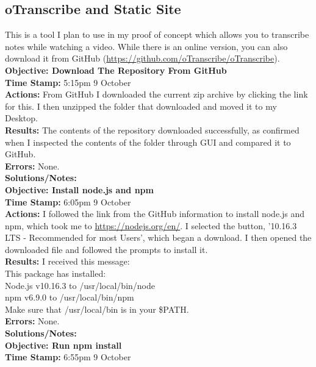 \documentclass{article}
\begin{document}
\begin{FlushLeft}
\pagebreak

\subsection{oTranscribe and Static Site}
This is a tool I plan to use in my proof of concept which allows you to transcribe notes while watching a video. While there is an online version, you can also download it from GitHub (\url{https://github.com/oTranscribe/oTranscribe}).\\
\vspace{5mm}
\textbf{Objective: Download The Repository From GitHub}\\ 
\textbf{Time Stamp:} 5:15pm 9 October\\
\textbf{Actions:} From GitHub I downloaded the current zip archive by clicking the link for this. I then unzipped the folder that downloaded and moved it to my Desktop.\\
\textbf{Results:} The contents of the repository downloaded successfully, as confirmed when I inspected the contents of the folder through GUI and compared it to GitHub.\\
\textbf{Errors:} None.\\
\textbf{Solutions/Notes:}\\
\vspace{5mm}
\textbf{Objective: Install node.js and npm}\\ 
\textbf{Time Stamp:} 6:05pm 9 October\\
\textbf{Actions:} I followed the link from the GitHub information to install node.js and npm, which took me to \url{https://nodejs.org/en/}. I selected the button, '10.16.3 LTS - Recommended for most Users', which began a download. I then opened the downloaded file and followed the prompts to install it.\\
\textbf{Results:} I received this message:\\
This package has installed:\\
Node.js v10.16.3 to /usr/local/bin/node\\
npm v6.9.0 to /usr/local/bin/npm \\
Make sure that /usr/local/bin is in your \$PATH.\\
\textbf{Errors:} None.\\
\textbf{Solutions/Notes:}\\
\vspace{5mm}
\textbf{Objective: Run npm install}\\ 
\textbf{Time Stamp:} 6:55pm 9 October\\

\end{FlushLeft}
\end{document}
